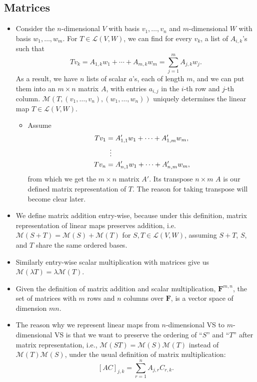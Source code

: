 \documentclass[11pt]{article}
\newcommand{\F}{\mathbf{F}}
\newcommand{\LVW}{\mathcal{L}(V,W)}
\newcommand{\M}{\mathcal{M}}
\newcommand{\bv}{v_1,\dots,v_n}
\newcommand{\bw}{w_1,\dots,w_n}
\begin{document}
\subsection{Matrices}
\begin{itemize}
    \item Consider the $n$-dimensional $V$ with basis $\bv$ and $m$-dimensional $W$ with basis $w_1,\dots,w_m$. For $T \in \LVW$, we can find for every $v_k$, a list of $A_{i,k}$'s such that \[Tv_k = A_{1,k}w_1 +\cdots+ A_{m,k}w_m = \sum_{j=1}^m A_{j,k}w_j.\] As a result, we have $n$ lists of scalar $a$'s, each of length $m$, and we can put them into an $m \times n$ matrix $A$, with entries $a_{i,j}$ in the $i$-th row and $j$-th column. $\mathcal{M}(T,(\bv),(\bw))$ uniquely determines the linear map $T \in \LVW$.
    \begin{itemize}
        \item Assume
        \begin{align*}
            Tv_1 & = A'_{1,1} w_1 + \dots + A'_{1,m} w_m, \\
            & \vdotswithin{=} \\
            Tv_n & = A'_{n,1} w_1 + \dots + A'_{n,m} w_m,
        \end{align*}
        from which we get the $m \times n$ matrix $A'$. Its transpose $n \times m$ $A$ is our defined matrix representation of $T$. The reason for taking transpose will become clear later.
    \end{itemize}
    \item We define matrix addition entry-wise, because under this definition, matrix representation of linear maps preserves addition, i.e. $\M(S+T) = \M(S) + \M(T)$ for $S,T \in \LVW$, assuming $S+T$, $S$, and $T$ share the same ordered bases.
    \item Similarly entry-wise scalar multiplication with matrices give us $\M(\lambda T) = \lambda \M(T)$.
    \item Given the definition of matrix addition and scalar multiplication, $\F^{m,n}$, the set of matrices with $m$ rows and $n$ columns over $\F$, is a vector space of dimension $mn$.
    \item The reason why we represent linear maps from $n$-dimensional VS to $m$-dimensional VS is that we want to preserve the ordering of ``$S$'' and ``$T$'' after matrix representation, i.e., $\M(ST) = \M(S)\M(T)$ instead of $\M(T)\M(S)$, under the usual definition of matrix multiplication: $$[AC]_{j,k} = \sum_{r = 1}^n A_{j,r}C_{r,k}.$$
    \begin{itemize}

\end{itemize}
\end{itemize}
\end{document}
